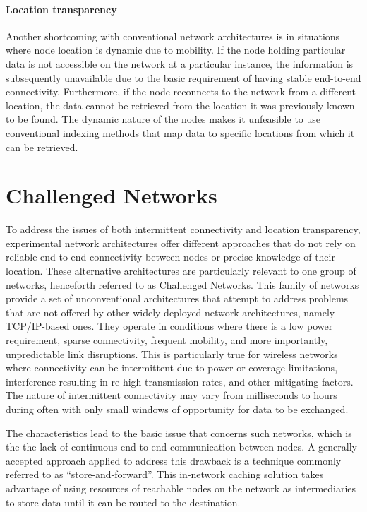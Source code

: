 \documentclass[a4paper,12pt]{report}      %
\begin{document}
\paragraph{Location transparency}
Another shortcoming with conventional network architectures is in situations where node location is dynamic due to mobility. If the node holding particular data is not accessible on the network at a particular instance, the information is subsequently unavailable due to the basic requirement of having stable end-to-end connectivity. Furthermore, if the node reconnects to the network from a different location, the data cannot be retrieved from the location it was previously known to be found. The dynamic nature of the nodes makes it unfeasible to use conventional indexing methods that map data to specific locations from which it can be retrieved.

\section{Challenged Networks}  

To address the issues of both intermittent connectivity and location transparency, experimental network
architectures offer different approaches that do not rely on reliable end-to-end connectivity between
nodes or precise knowledge of their location. These alternative architectures are particularly relevant to
one group of networks, henceforth referred to as Challenged Networks. This family of networks
provide a set of unconventional architectures that attempt to address problems that are not offered by
other widely deployed network architectures, namely TCP/IP-based ones. They operate in conditions
where there is a low power requirement, sparse connectivity, frequent mobility, and more importantly,
unpredictable link disruptions. This is particularly true for wireless networks where connectivity can be
intermittent due to power or coverage limitations, interference resulting in re-high transmission rates,
and other mitigating factors. The nature of intermittent connectivity may vary from milliseconds to
hours during often with only small windows of opportunity for data to be exchanged\cite{DTNarch}. 

The characteristics lead to the basic issue that concerns such networks, which is the the lack of
continuous end-to-end communication between nodes. A generally accepted approach applied to
address this drawback is a technique commonly referred to as “store-and-forward”. This in-network caching solution takes advantage of using resources of reachable nodes on the network as intermediaries to store data until it can be routed to the destination.
\end{document}
